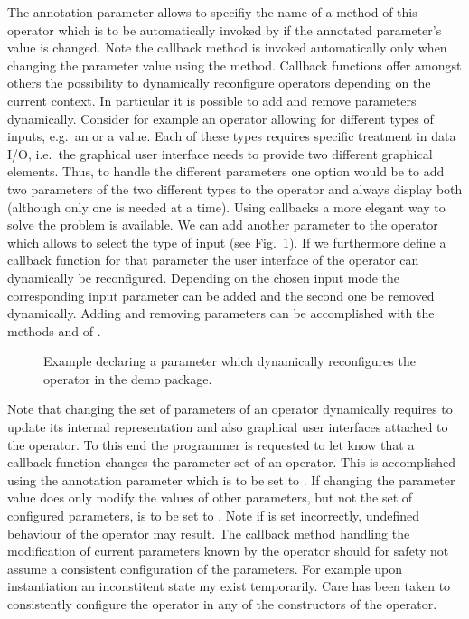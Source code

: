 The annotation parameter  allows to specifiy the name of a method of this operator
which is to be automatically invoked by \alida if the annotated parameter's value is changed.
Note the callback method is invoked automatically only when changing the
parameter value using the  method. Callback functions offer amongst others the possibility to
dynamically reconfigure operators depending on the current context. In particular it is possible to
add and remove parameters dynamically. Consider for example an operator allowing for different types
of inputs, e.g.~an  or a  value. Each of these types requires specific treatment in data
I/O, i.e.~the graphical user interface needs to provide two different graphical elements. Thus,
to handle the different parameters one option would be to add two parameters of the two different
types to the operator and always display both (although only one is needed at a time). Using
callbacks a more elegant way to solve the problem is available. We can add another parameter
 to the operator which allows to select the type of input
(see Fig.~\ref{exa:callback-define}). If we furthermore
define a callback function for that parameter the user interface of the operator can dynamically be
reconfigured. Depending on the chosen input mode the corresponding input parameter can be added
and the second one be removed dynamically. Adding and removing parameters can be accomplished with
the methods  and  of .

\begin{figure}[h]

\caption{\label{exa:callback-define}Example declaring a parameter which dynamically reconfigures the operator  in the demo package.}
\end{figure}


Note that changing the set of parameters of an operator
dynamically requires \alida to update its internal representation and also graphical user interfaces
attached to the operator. To this end the programmer is requested to let \alida know that a callback
function changes the parameter set of an operator. This is accomplished using the
annotation parameter  which is to be set to .
If changing the parameter value does only modify the values of other parameters,
but not the set of configured parameters,
  is to be set to .
Note if  is set incorrectly,
undefined behaviour of the operator may result.
The callback method handling the modification of current parameters known by the operator
should for safety not assume a consistent configuration of the parameters.
For example upon instantiation an inconstitent state my exist temporarily.
Care has been taken to consistently configure the operator in any of the constructors of the operator.

